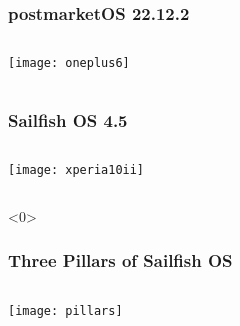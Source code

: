 \documentclass[
	notes=none,
	aspectratio=169
]{beamer}
\begin{document}

\begin{frame}
\frametitle{postmarketOS 22.12.2}

\begin{columns}[T]
\begin{column}[T]{1.0\textwidth}

\vspace{0.43cm}
\begin{center}
\texttt{[image: oneplus6]}
\end{center}

\end{column}
\end{columns}

\end{frame}
\note{
}


\begin{frame}
\frametitle{Sailfish OS 4.5}

\begin{columns}[T]
\begin{column}[T]{1.0\textwidth}

\vspace{0.3cm}
\begin{center}
\texttt{[image: xperia10ii]}
\end{center}

\end{column}
\end{columns}

\end{frame}
\note{
}


\begin{frame}<0>
\frametitle{Three Pillars of Sailfish OS}

\begin{columns}[T]
\begin{column}[T]{1.0\textwidth}

\vspace{0.5cm}
\begin{center}
\texttt{[image: pillars]}
\end{center}

\end{column}
\end{columns}

\end{frame}
\note{
}
\end{document}
